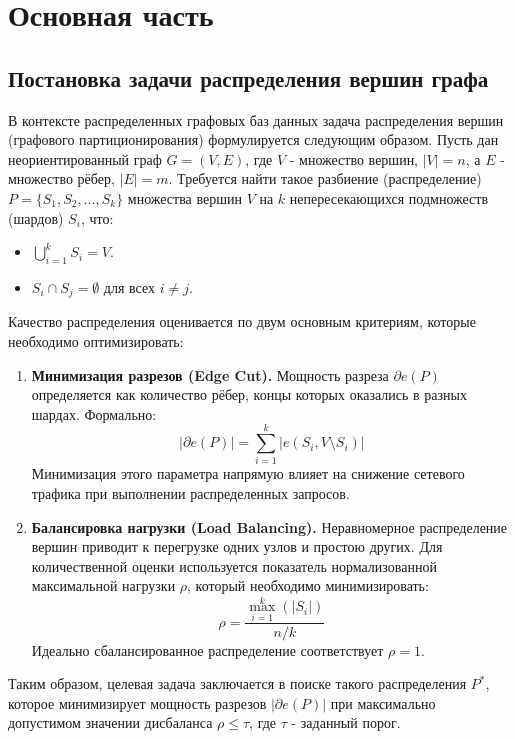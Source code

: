 \section{Основная часть}

\subsection{Постановка задачи распределения вершин графа}

В контексте распределенных графовых баз данных задача распределения вершин (графового партиционирования) формулируется следующим образом. Пусть дан неориентированный граф \(G = (V, E)\), где \(V\) - множество вершин, \(|V| = n\), а \(E\) - множество рёбер, \(|E| = m\). Требуется найти такое разбиение (распределение) \(P = \{S_1, S_2, ..., S_k\}\) множества вершин \(V\) на \(k\) непересекающихся подмножеств (шардов) \(S_i\), что:
\begin{itemize}
    \item \(\bigcup_{i=1}^{k} S_i = V\).
    \item \(S_i \cap S_j = \emptyset\) для всех \(i \neq j\).
\end{itemize}

Качество распределения оценивается по двум основным критериям, которые необходимо оптимизировать:
\begin{enumerate}
    \item \textbf{Минимизация разрезов (Edge Cut).} Мощность разреза \(\partial e(P)\) определяется как количество рёбер, концы которых оказались в разных шардах. Формально:
    $$
    |\partial e(P)| = \sum_{i=1}^{k} |e(S_i, V \setminus S_i)|
    $$
    Минимизация этого параметра напрямую влияет на снижение сетевого трафика при выполнении распределенных запросов.
    \item \textbf{Балансировка нагрузки (Load Balancing).} Неравномерное распределение вершин приводит к перегрузке одних узлов и простою других. Для количественной оценки используется показатель нормализованной максимальной нагрузки \(\rho\), который необходимо минимизировать:
    $$
    \rho = \frac{\max_{i=1}^{k} (|S_i|)}{n/k}
    $$
    Идеально сбалансированное распределение соответствует \(\rho = 1\).
\end{enumerate}
Таким образом, целевая задача заключается в поиске такого распределения \(P^*\), которое минимизирует мощность разрезов \(|\partial e(P)|\) при максимально допустимом значении дисбаланса \(\rho \leq \tau\), где \(\tau\) - заданный порог.

